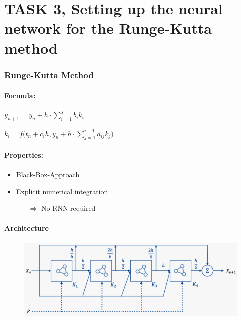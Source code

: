 \section{TASK 3, Setting up the neural network for the Runge-Kutta method}

\begin{frame}
	\frametitle{Runge-Kutta Method}
	\paragraph{Formula:}
	\quad\quad $y_{n+1} = y_n + h \cdot \sum_{i=1}^s b_i k_i$
	
	\quad\quad $k_i = f \Bigg( t_n + c_i h, y_n + h \cdot \sum_{j=1}^{i-1} a_{ij} k_j\Bigg)$
	\vspace{1mm}
	
	\paragraph{Properties:}\vspace{-2mm}
	\begin{itemize}
		\item Black-Box-Approach
		\item Explicit numerical integration
		\begin{itemize}
			\item[$\Rightarrow$] No RNN required
		\end{itemize}
	\end{itemize}
	
	\paragraph{Architecture}\vspace{2mm}
	\begin{figure}[H]
		\centering
		\includegraphics[width=.7\linewidth]{figures/runge_kutta/net_architecture}
	\end{figure}
\end{frame}

